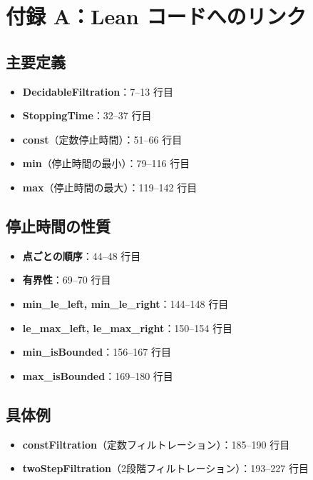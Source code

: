 \documentclass[12pt,a4paper,ja=standard]{bxjsarticle}
\theoremstyle{definition}
\begin{document}
\section*{付録 A：Lean コードへのリンク}

\subsection*{主要定義}

\begin{itemize}
    \item \textbf{DecidableFiltration}：7--13 行目
    \item \textbf{StoppingTime}：32--37 行目
    \item \textbf{const}（定数停止時間）：51--66 行目
    \item \textbf{min}（停止時間の最小）：79--116 行目
    \item \textbf{max}（停止時間の最大）：119--142 行目
\end{itemize}

\subsection*{停止時間の性質}

\begin{itemize}
    \item \textbf{点ごとの順序}：44--48 行目
    \item \textbf{有界性}：69--70 行目
    \item \textbf{min\_le\_left, min\_le\_right}：144--148 行目
    \item \textbf{le\_max\_left, le\_max\_right}：150--154 行目
    \item \textbf{min\_isBounded}：156--167 行目
    \item \textbf{max\_isBounded}：169--180 行目
\end{itemize}

\subsection*{具体例}

\begin{itemize}
    \item \textbf{constFiltration}（定数フィルトレーション）：185--190 行目
    \item \textbf{twoStepFiltration}（2段階フィルトレーション）：193--227 行目
\end{itemize}
\end{document}
